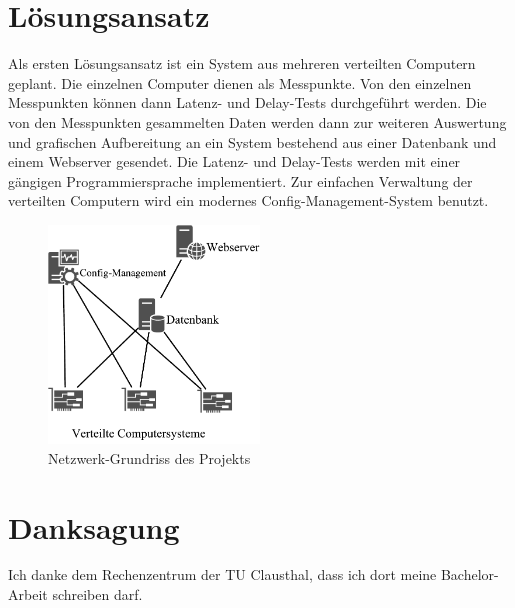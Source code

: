\documentclass[conference]{IEEEtran}
\begin{document}
\section*{Lösungsansatz}
Als ersten Lösungsansatz ist ein System aus mehreren verteilten
Computern geplant. Die einzelnen Computer dienen als Messpunkte. Von den
einzelnen Messpunkten können dann Latenz- und Delay-Tests durchgeführt
werden. Die von den Messpunkten gesammelten Daten werden dann zur
weiteren Auswertung und grafischen Aufbereitung an ein System bestehend
aus einer Datenbank und einem Webserver gesendet. Die Latenz- und
Delay-Tests werden mit einer gängigen Programmiersprache implementiert.
Zur einfachen Verwaltung der verteilten Computern wird ein modernes
Config-Management-System benutzt.
\begin{figure}[h]
    \centering
    \includegraphics[width=0.5\textwidth]{figures/network.pdf}
    \caption{Netzwerk-Grundriss des Projekts}\label{fig:1}
\end{figure}

\section*{Danksagung}
Ich danke dem Rechenzentrum der TU Clausthal, dass ich dort meine
Bachelor-Arbeit schreiben darf.
\end{document}
